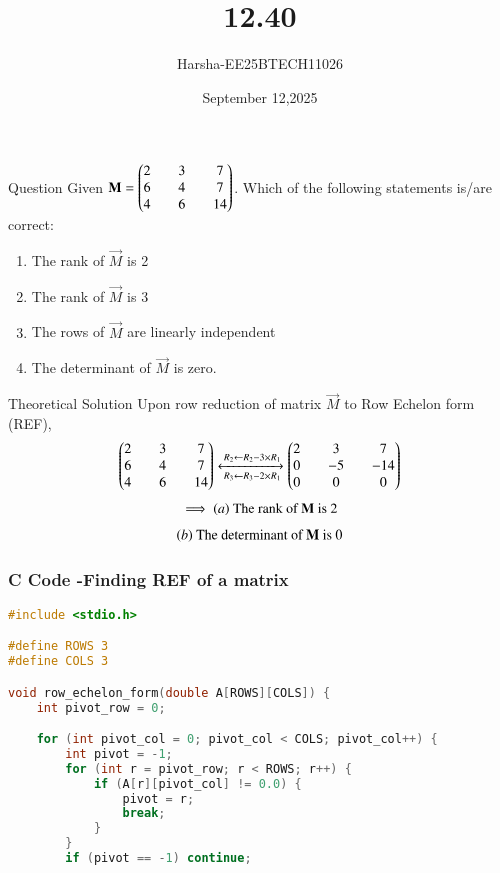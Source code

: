 \documentclass{beamer}
\title %
{12.40}
\date{September 12,2025}
\author %
{Harsha-EE25BTECH11026}
\begin{document}
\frame{\titlepage}


\begin{frame}{Question}
Given $\mathbf{M}=\begin{pmatrix}2&&3&&7\\6&&4&&7\\4&&6&&14\end{pmatrix}$. Which of the following statements is/are correct:
\begin{enumerate}
    \item The rank of $\vec{M}$ is 2
    \item The rank of $\vec{M}$ is 3
    \item The rows of $\vec{M}$ are linearly independent 
    \item The determinant of $\vec{M}$ is zero.
\end{enumerate}
\end{frame}

\begin{frame}{Theoretical Solution}
Upon row reduction of matrix $\vec{M}$ to Row Echelon form (REF),
\begin{align}
    \begin{pmatrix}2&&3&&7\\6&&4&&7\\4&&6&&14\end{pmatrix}
    \xleftrightarrow[\,R_3 \gets R_3-2 \times R_1]{\,R_2 \gets R_2 - 3 \times R_1}
    \begin{pmatrix}2&&3&&7\\0&&-5&&-14\\0&&0&&0\end{pmatrix}
\end{align}
\begin{align*}
    \implies \text{$\left(a\right)$ The rank of $\mathbf{M}$ is 2}
\end{align*}
\begin{align*}
    \text{$\left(b\right)$ The determinant of $\mathbf{M}$ is 0}
\end{align*}

\end{frame}

\begin{frame}[fragile]
    \frametitle{C Code -Finding REF of a matrix}

    \begin{lstlisting}[language=C]
#include <stdio.h>

#define ROWS 3
#define COLS 3

void row_echelon_form(double A[ROWS][COLS]) {
    int pivot_row = 0;

    for (int pivot_col = 0; pivot_col < COLS; pivot_col++) {
        int pivot = -1;
        for (int r = pivot_row; r < ROWS; r++) {
            if (A[r][pivot_col] != 0.0) {
                pivot = r;
                break;
            }
        }
        if (pivot == -1) continue;
    \end{lstlisting}
\end{frame}
\end{document}
